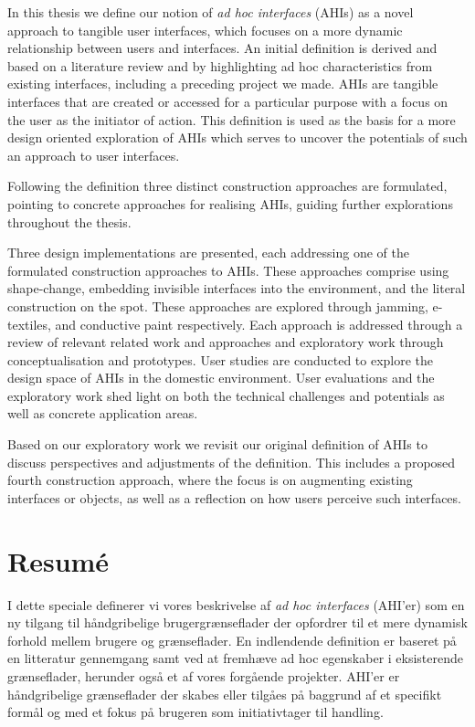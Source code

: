 
In this thesis we define our notion of \emph{ad hoc interfaces} (AHIs) as a novel approach to tangible user interfaces, which focuses on a more dynamic relationship between users and interfaces.
An initial definition is derived and based on a literature review and by highlighting ad hoc characteristics from existing interfaces, including a preceding project we made.
AHIs are tangible interfaces that are created or accessed for a particular purpose with a focus on the user as the initiator of action.
This definition is used as the basis for a more design oriented exploration of AHIs which serves to uncover the potentials of such an approach to user interfaces.

Following the definition three distinct construction approaches are formulated, pointing to concrete approaches for realising AHIs, guiding further explorations throughout the thesis.

Three design implementations are presented, each addressing one of the formulated construction approaches to AHIs.
These approaches comprise using shape-change, embedding invisible interfaces into the environment, and the literal construction on the spot.
These approaches are explored through jamming, e-textiles, and conductive paint respectively. 
Each approach is addressed through a review of relevant related work and approaches and exploratory work through conceptualisation and prototypes.
User studies are conducted to explore the design space of AHIs in the domestic environment.
User evaluations and the exploratory work shed light on both the technical challenges and potentials as well as concrete application areas.

Based on our exploratory work we revisit our original definition of AHIs to discuss perspectives and adjustments of the definition.
This includes a proposed fourth construction approach, where the focus is on augmenting existing interfaces or objects, as well as a reflection on how users perceive such interfaces.

\chapter*{Resum\'e}

I dette speciale definerer vi vores beskrivelse af \emph{ad hoc interfaces} (AHI'er) som en ny tilgang til håndgribelige brugergrænseflader der opfordrer til et mere dynamisk forhold mellem brugere og grænseflader.
En indlendende definition er baseret på en litteratur gennemgang samt ved at fremhæve ad hoc egenskaber i eksisterende grænseflader, herunder også et af vores forgående projekter.
AHI'er er håndgribelige grænseflader der skabes eller tilgåes på baggrund af et specifikt formål og med et fokus på brugeren som initiativtager til handling.

